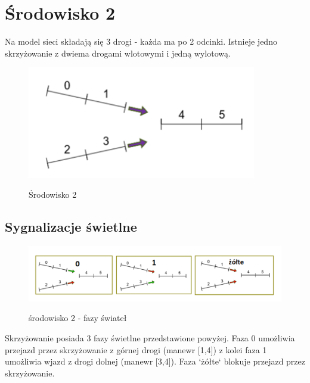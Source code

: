 \documentclass[12pt]{book}
\theoremstyle{plain}
\begin{document}
\section{Środowisko 2}
Na model sieci składają się 3 drogi - każda ma po 2 odcinki. Istnieje jedno skrzyżowanie z dwiema drogami wlotowymi i jedną wylotową.
	\begin{figure}[H]
	\centering
	\includegraphics[width=10cm]{images/env_14}
	\label{fig:env_14}
	\caption{Środowisko 2}
\end{figure}

\subsection{Sygnalizacje świetlne}	
\begin{figure}[H]
	\centering
	\includegraphics[width=17cm]{images/env_14_fazy}
	\label{fig:env_14_fazy}
	\caption{środowisko 2 - fazy świateł}
\end{figure}\noindent
Skrzyżowanie posiada 3 fazy świetlne przedstawione powyżej. Faza 0 umożliwia przejazd przez skrzyżowanie z górnej drogi (manewr [1,4]) z kolei faza 1 umożliwia wjazd z drogi dolnej (manewr [3,4]). Faza `żółte` blokuje przejazd przez skrzyżowanie.
\end{document}
